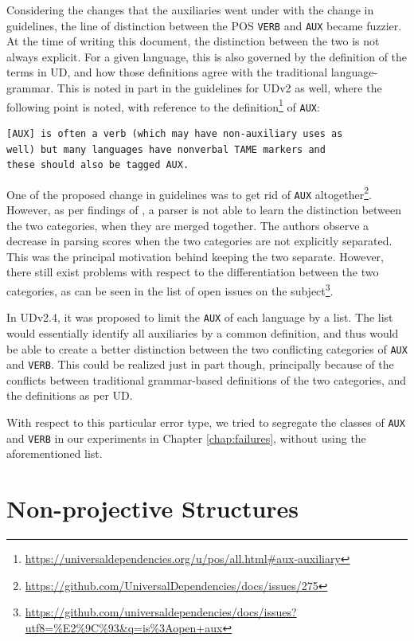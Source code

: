 Considering the changes that the auxiliaries went under with the change in guidelines, the line of distinction between the POS \verb|VERB| and \verb|AUX| became fuzzier. At the time of writing this document, the distinction between the two is not always explicit. For a given language, this is also governed by the definition of the terms in UD, and how those definitions agree with the traditional language-grammar. This is noted in part in the guidelines for UDv2 as well, where the following point is noted, with reference to the definition\footnote{\url{https://universaldependencies.org/u/pos/all.html\#aux-auxiliary}} of \verb|AUX|:

\begin{verbatim}
[AUX] is often a verb (which may have non-auxiliary uses as 
well) but many languages have nonverbal TAME markers and
these should also be tagged AUX.
\end{verbatim}

One of the proposed change in guidelines was to get rid of \verb|AUX| altogether\footnote{\url{https://github.com/UniversalDependencies/docs/issues/275}}. However, as per findings of \cite{de2016should}, a parser is not able to learn the distinction between the two categories, when they are merged together. The authors observe a decrease in parsing scores when the two categories are not explicitly separated. This was the principal motivation behind keeping the two separate. However, there still exist problems with respect to the differentiation between the two categories, as can be seen in the list of open issues on the subject\footnote{\url{https://github.com/universaldependencies/docs/issues?utf8=\%E2\%9C\%93&q=is\%3Aopen+aux}}.

In UDv2.4, it was proposed to limit the \verb|AUX| of each language by a list. The list would essentially identify all auxiliaries by a common definition, and thus would be able to create a better distinction between the two conflicting categories of \verb|AUX| and \verb|VERB|. This could be realized just in part though, principally because of the conflicts between traditional grammar-based definitions of the two categories, and the definitions as per UD.

With respect to this particular error type, we tried to segregate the classes of \verb|AUX| and \verb|VERB| in our experiments in Chapter \ref{chap:failures}, without using the aforementioned list. 

\section{Non-projective Structures}
\label{ssec:nonproj}

